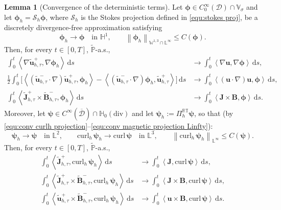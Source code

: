 \documentclass[11pt, reqno]{amsart}
\theoremstyle{definition}
\newtheorem{lemma}[theorem]{Lemma}
\numberwithin{equation}{section}
\newcommand{\curl}{\mathrm{curl}\,}
\newcommand{\bff}{\boldsymbol}
\newcommand{\bb}{\mathbb}
\newcommand{\ds}{\,\mathrm{d}s}
\newcommand{\norm}[2]{\left\|{#1}\right\|_{#2}}
\newcommand{\inpro}[2]{\left\langle#1,#2\right\rangle}
\newcommand{\hzerodiv}{\mathbb{H}_0(\mathrm{div})}
\newcommand{\curlh}{\mathrm{curl}_h\,}
\begin{document}
\begin{lemma}[Convergence of the deterministic terms]
	\label{lem:conv deterministic terms}
	Let $\bff\phi\in C^\infty_0(\mathscr D)\cap\bb V_\sigma $ and let
	$\bff\phi_h=\mathcal S_h\bff\phi$, where $\mathcal{S}_h$ is the Stokes projection defined in \eqref{equ:stokes proj}, be a discretely
	divergence-free approximation satisfying
	\[
	\bff\phi_h\to\bff\phi
	\quad\text{in }\bb H^1,
	\qquad
	\norm{\bff\phi_h}{\bb W^{1,3}\cap \bb{L}^\infty}\le C(\bff\phi).
	\]
	Then, for every $t\in[0,T]$, $\widetilde{\bb P}$-a.s.,
	\begin{align}
		\label{equ:conv viscous}
		\int_0^t
		\inpro{\nabla\widetilde{\bff u}_{h,\tau}^{+}}
		{\nabla\bff\phi_h}\ds
		&\to
		\int_0^t
		\inpro{\nabla\bff u}{\nabla\bff\phi}\ds,
		\\
		\label{equ:conv convection}
		\frac12\int_0^t
		\Big[
		\inpro{(\widetilde{\bff u}_{h,\tau}^{-}\cdot\nabla)
			\widetilde{\bff u}_{h,\tau}^{+}}{\bff\phi_h}
		-
		\inpro{(\widetilde{\bff u}_{h,\tau}^{-}\cdot\nabla)
			\bff\phi_h}{\widetilde{\bff u}_{h,\tau}^{+}}
		\Big]\ds
		&\to
		\int_0^t
		\inpro{(\bff u\cdot\nabla)\bff u}{\bff\phi}\ds,
		\\
		\label{equ:conv Lorentz}
		\int_0^t
		\inpro{\widetilde{\bff J}_{h,\tau}^{+}
			\times\widetilde{\bff B}_{h,\tau}^{-}}{\bff\phi_h}\ds
		&\to
		\int_0^t
		\inpro{\bff J\times\bff B}{\bff\phi}\ds .
	\end{align}
	Moreover, let
	$\bff\psi\in C^\infty(\overline{\mathscr D})\cap\hzerodiv$ and let $\bff\psi_h:=\Pi_h^{\bb{RT}}\bff\psi$, so that (by \eqref{equ:conv curlh projection}--\eqref{equ:conv magnetic projection Linfty}):
	\[
	\bff\psi_h\to\bff\psi
	\quad\text{in }\bb L^2,
	\qquad
	\curlh\bff\psi_h\to\curl\bff\psi
	\quad\text{in }\bb L^3,
	\qquad
	\norm{\curlh\bff\psi_h}{\bb L^\infty}\le C(\bff\psi).
	\]
	Then, for every $t\in[0,T]$, $\widetilde{\bb P}$-a.s.,
	\begin{align}
		\label{equ:conv magnetic resistive}
		\int_0^t
		\inpro{\widetilde{\bff J}_{h,\tau}^{+}}{\curlh\bff\psi_h}\ds
		&\to
		\int_0^t
		\inpro{\bff J}{\curl\bff\psi}\ds,
		\\
		\label{equ:conv magnetic Hall}
		\int_0^t
		\inpro{\widetilde{\bff J}_{h,\tau}^{+}
			\times\widetilde{\bff B}_{h,\tau}^{-}}
		{\curlh\bff\psi_h}\ds
		&\to
		\int_0^t
		\inpro{\bff J\times\bff B}{\curl\bff\psi}\ds,
		\\
		\label{equ:conv magnetic transport}
		\int_0^t
		\inpro{\widetilde{\bff u}_{h,\tau}^{+}
			\times\widetilde{\bff B}_{h,\tau}^{-}}
		{\curlh\bff\psi_h}\ds
		&\to
		\int_0^t
		\inpro{\bff u\times\bff B}{\curl\bff\psi}\ds .
	\end{align}
\end{lemma}
\end{document}
